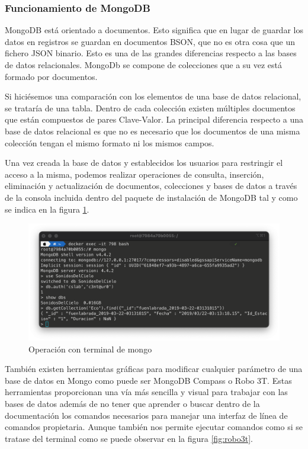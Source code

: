 \subsubsection{Funcionamiento de MongoDB}
MongoDB está orientado a documentos. Esto significa que en lugar de guardar los datos en registros se guardan en documentos BSON, que no es otra cosa que un fichero JSON binario.
Esto es una de las grandes diferencias respecto a las bases de datos relacionales. 
MongoDb se compone de colecciones que a su vez está formado por documentos. 

Si hiciésemos una comparación con los elementos de una base de datos relacional, se trataría de una tabla. Dentro de cada colección existen múltiples documentos que están compuestos de pares Clave-Valor. 
La principal diferencia respecto a una base de datos relacional es que no es necesario que los documentos de una misma colección tengan el mismo formato ni los mismos campos.

Una vez creada la base de datos y establecidos los usuarios para restringir el acceso a la misma, podemos realizar operaciones de consulta, inserción, eliminación y actualización de documentos, colecciones y bases de datos a través de la consola incluida dentro del paquete de instalación de MongoDB tal y como se indica en la figura \ref{fig:terminal_mongo}. 

\begin{figure}[H]
    \centering
    \includegraphics[scale=0.4]{include/capturas/TerminalMongo.png}
    \caption{Operación con terminal de mongo}
    \label{fig:terminal_mongo}
\end{figure}

También existen herramientas gráficas para modificar cualquier parámetro de una base de datos en Mongo como puede ser MongoDB Compass o Robo 3T. Estas herramientas proporcionan una vía más sencilla y visual para trabajar con las bases de datos además de no tener que aprender o buscar dentro de la documentación los comandos necesarios para manejar una interfaz de línea de comandos propietaria. Aunque también nos permite ejecutar comandos como si se tratase del terminal como se puede observar en la figura \ref{fig:robo3t}.

